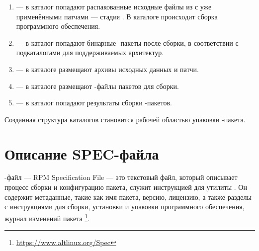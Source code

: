 
\begin{enumerate}
	\item {} --- в каталог попадают распакованные исходные файлы из
		 с уже применёнными патчами --- стадия .
		В каталоге  происходит сборка программного обеспечения.
	\item {} --- в каталог  попадают бинарные -пакеты после
		сборки, в соответствии с подкаталогами для поддерживаемых архитектур.
	\item {} --- в каталоге размещают архивы исходных данных и патчи.
	\item {} --- в каталоге размещают -файлы пакетов для сборки.
	\item {} --- в каталог  попадают результаты сборки -пакетов.
\end{enumerate}

Созданная структура каталогов становится рабочей областью упаковки -пакета.



\section{Описание SPEC-файла}
-файл --- RPM Specification File --- это текстовый файл, который описывает процесс сборки и конфигурацию
пакета, служит инструкцией для утилиты . Он содержит метаданные, такие как имя пакета, версию,
лицензию, а также разделы с инструкциями для сборки, установки и упаковки программного обеспечения, журнал
изменений пакета%
\footnote{\href{https://www.altlinux.org/Spec}%
{https://www.altlinux.org/Spec}}. %

